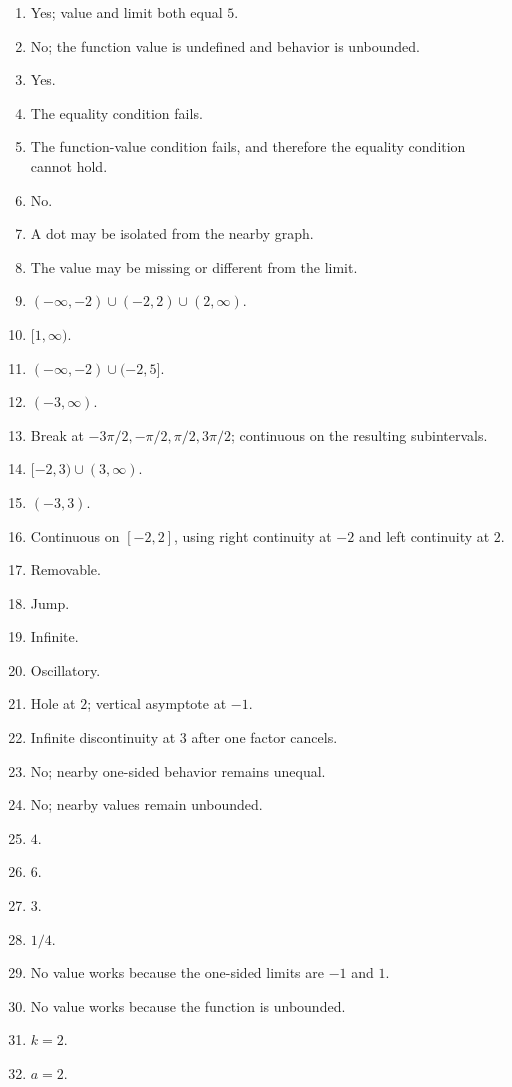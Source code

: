 \documentclass[11pt,openany]{book}
\theoremstyle{bgplain}
\begin{document}
\begin{enumerate}[label=\textbf{5.\arabic*}]
  \item Yes; value and limit both equal \(5\).
  \item No; the function value is undefined and behavior is unbounded.
  \item Yes.
  \item The equality condition fails.
  \item The function-value condition fails, and therefore the equality condition cannot hold.
  \item No.
  \item A dot may be isolated from the nearby graph.
  \item The value may be missing or different from the limit.
  \item \(( -\infty,-2)\cup(-2,2)\cup(2,\infty)\).
  \item \([1,\infty)\).
  \item \(( -\infty,-2)\cup(-2,5]\).
  \item \((-3,\infty)\).
  \item Break at \(-3\pi/2,-\pi/2,\pi/2,3\pi/2\); continuous on the resulting subintervals.
  \item \([-2,3)\cup(3,\infty)\).
  \item \((-3,3)\).
  \item Continuous on \([-2,2]\), using right continuity at \(-2\) and left continuity at \(2\).
  \item Removable.
  \item Jump.
  \item Infinite.
  \item Oscillatory.
  \item Hole at \(2\); vertical asymptote at \(-1\).
  \item Infinite discontinuity at \(3\) after one factor cancels.
  \item No; nearby one-sided behavior remains unequal.
  \item No; nearby values remain unbounded.
  \item \(4\).
  \item \(6\).
  \item \(3\).
  \item \(1/4\).
  \item No value works because the one-sided limits are \(-1\) and \(1\).
  \item No value works because the function is unbounded.
  \item \(k=2\).
  \item \(a=2\).

\end{enumerate}
\end{document}
